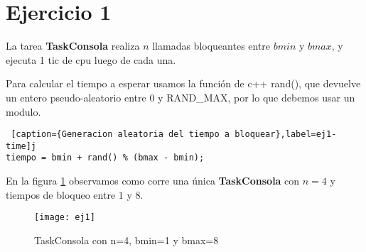 \section{Ejercicio 1}

La tarea \textbf{TaskConsola} realiza $n$ llamadas bloqueantes entre $bmin$ y $bmax$, y ejecuta 1 tic de cpu luego de cada una.

Para calcular el tiempo a esperar usamos la función de c++ \textsf{rand()}, que devuelve un entero pseudo-aleatorio entre 0 y RAND\_MAX, por lo que debemos usar un modulo.
\\

\begin{lstlisting} [caption={Generacion aleatoria del tiempo a bloquear},label=ej1-time]j
tiempo = bmin + rand() % (bmax - bmin);
\end{lstlisting}

En la figura \ref{fig:ej1} observamos como corre una única \textbf{TaskConsola} con $n = 4$ y tiempos de bloqueo entre $1$ y $8$.

\begin{figure}[H]
    \centering
    \texttt{[image: ej1]}
    \caption{TaskConsola con n=4, bmin=1 y bmax=8}
    \label{fig:ej1}
\end{figure}

